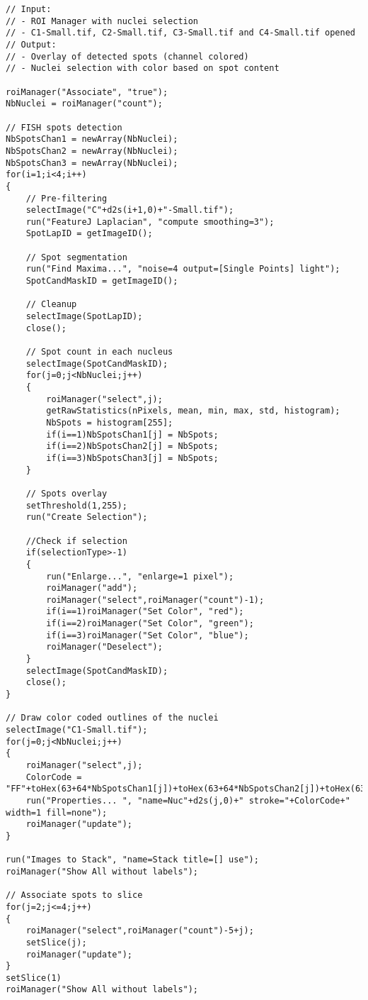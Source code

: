 \begin{lstlisting}
// Input: 
// - ROI Manager with nuclei selection
// - C1-Small.tif, C2-Small.tif, C3-Small.tif and C4-Small.tif opened
// Output: 
// - Overlay of detected spots (channel colored)
// - Nuclei selection with color based on spot content

roiManager("Associate", "true");
NbNuclei = roiManager("count");

// FISH spots detection
NbSpotsChan1 = newArray(NbNuclei);
NbSpotsChan2 = newArray(NbNuclei);
NbSpotsChan3 = newArray(NbNuclei);
for(i=1;i<4;i++)
{	
	// Pre-filtering
	selectImage("C"+d2s(i+1,0)+"-Small.tif");
	run("FeatureJ Laplacian", "compute smoothing=3");
	SpotLapID = getImageID();
	
	// Spot segmentation
	run("Find Maxima...", "noise=4 output=[Single Points] light");
	SpotCandMaskID = getImageID();
	
	// Cleanup
	selectImage(SpotLapID);	
	close();

	// Spot count in each nucleus
	selectImage(SpotCandMaskID);
	for(j=0;j<NbNuclei;j++)
	{
		roiManager("select",j);
		getRawStatistics(nPixels, mean, min, max, std, histogram);
		NbSpots = histogram[255];
		if(i==1)NbSpotsChan1[j] = NbSpots;
		if(i==2)NbSpotsChan2[j] = NbSpots;
		if(i==3)NbSpotsChan3[j] = NbSpots;
	}
		
	// Spots overlay
	setThreshold(1,255);
	run("Create Selection");
	
	//Check if selection
	if(selectionType>-1)
	{
		run("Enlarge...", "enlarge=1 pixel");
		roiManager("add");
		roiManager("select",roiManager("count")-1);
		if(i==1)roiManager("Set Color", "red");
		if(i==2)roiManager("Set Color", "green");
		if(i==3)roiManager("Set Color", "blue");
		roiManager("Deselect");
	}
	selectImage(SpotCandMaskID);
	close();
}
	
// Draw color coded outlines of the nuclei
selectImage("C1-Small.tif");
for(j=0;j<NbNuclei;j++)
{
	roiManager("select",j);
	ColorCode = "FF"+toHex(63+64*NbSpotsChan1[j])+toHex(63+64*NbSpotsChan2[j])+toHex(63+64*NbSpotsChan3[j]);
	run("Properties... ", "name=Nuc"+d2s(j,0)+" stroke="+ColorCode+" width=1 fill=none");
	roiManager("update");
}

run("Images to Stack", "name=Stack title=[] use");
roiManager("Show All without labels");

// Associate spots to slice
for(j=2;j<=4;j++)
{
	roiManager("select",roiManager("count")-5+j);
	setSlice(j);
	roiManager("update");
}
setSlice(1)
roiManager("Show All without labels");

\end{lstlisting}
